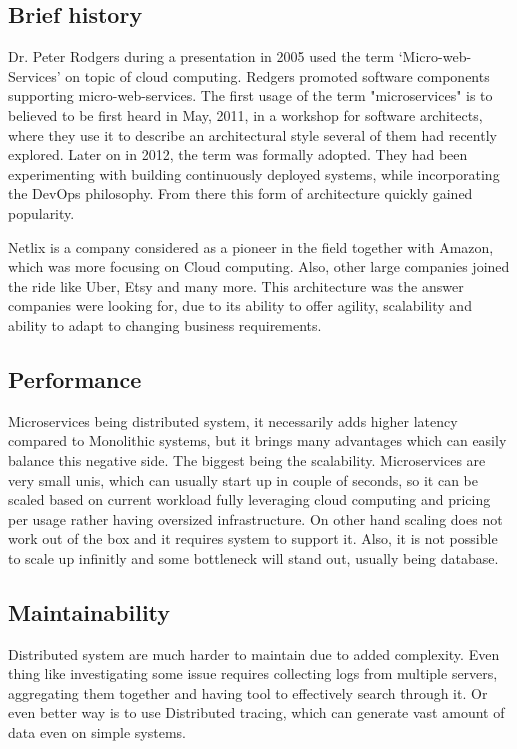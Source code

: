 \subsection{Brief history}
Dr. Peter Rodgers during a presentation in 2005 used the term `Micro-web-Services' on topic of cloud computing. Redgers promoted software components supporting micro-web-services. The first usage of the term "microservices" is to believed to be first heard in May, 2011, in a workshop for software architects, where they use it to describe an architectural style several of them had recently explored. Later on in 2012, the term was formally adopted. They had been experimenting with building continuously deployed systems, while incorporating the DevOps philosophy. From there this form of architecture quickly gained popularity. \cite{BRIEF_HISTORY_OF_MS}

Netlix is a company considered as a pioneer in the field together with Amazon, which was more focusing on Cloud computing. Also, other large companies joined the ride like Uber, Etsy and many more. This architecture was the answer companies were looking for, due to its ability to offer agility, scalability and ability to adapt to changing business requirements. \cite{MS_COMPANIES}



\subsection{Performance}
\label{section:microservices:performance}
Microservices being distributed system, it necessarily adds higher latency compared to Monolithic systems, but it brings many advantages which can easily balance this negative side. The biggest being the scalability. Microservices are very small unis, which can usually start up in couple of seconds, so it can be scaled based on current workload fully leveraging cloud computing and pricing per usage rather having oversized infrastructure. On other hand scaling does not work out of the box and it requires system to support it. Also, it is not possible to scale up infinitly and some bottleneck will stand out, usually being database.


\subsection{Maintainability}
Distributed system are much harder to maintain due to added complexity. Even thing like investigating some issue requires collecting logs from multiple servers, aggregating them together and having tool to effectively search through it. Or even better way is to use Distributed tracing, which can generate vast amount of data even on simple systems.

